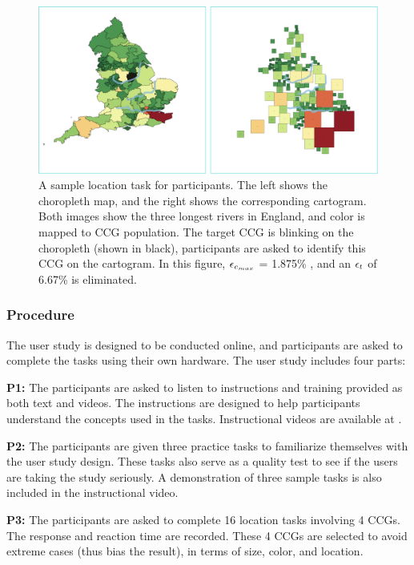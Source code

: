     {
        \begin{figure}[tb!]
            \centering
            \includegraphics[width=\columnwidth,keepaspectratio]{figure/evaluation/task.png}
            \caption{A sample location task for participants. The left shows the choropleth map, and the right shows the corresponding cartogram. Both images show the three longest rivers in England, and color is mapped to CCG population. The target CCG is blinking on the choropleth (shown in black), participants are asked to identify this CCG on the cartogram. In this figure, $ \epsilon_{c_{max}} $ = 1.875\% , and an $ \epsilon_{t} $ of 6.67\% is eliminated. }
            \label{fig:task}
        \end{figure}
    }

\subsubsection{Procedure}

The user study is designed to be conducted online, and participants are asked to complete the tasks using their own hardware. The user study includes four parts:

\textbf{P1:} The participants are asked to listen to instructions and training provided as both text and videos. The instructions are designed to help participants understand the concepts used in the tasks. Instructional videos are available at .

\textbf{P2:} The participants are given three practice tasks to familiarize themselves with the user study design. These tasks also serve as a quality test to see if the users are taking the study seriously. A demonstration of three sample tasks is also included in the instructional video.

\textbf{P3:} The participants are asked to complete 16 location tasks involving 4 CCGs. The response and reaction time are recorded. These 4 CCGs are selected to avoid extreme cases (thus bias the result), in terms of size, color, and location.

